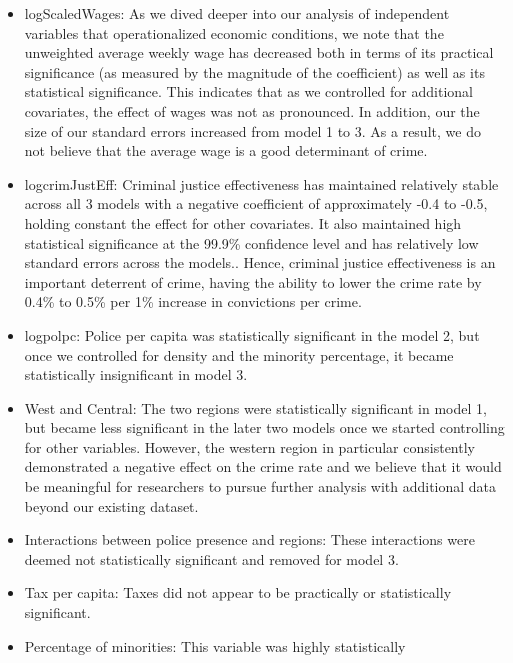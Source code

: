 \documentclass[]{article}
\providecommand{\tightlist}{%
  \setlength{\itemsep}{0pt}\setlength{\parskip}{0pt}}
\begin{document}
\begin{itemize}
\tightlist
\item
  logScaledWages: As we dived deeper into our analysis of independent
  variables that operationalized economic conditions, we note that the
  unweighted average weekly wage has decreased both in terms of its
  practical significance (as measured by the magnitude of the
  coefficient) as well as its statistical significance. This indicates
  that as we controlled for additional covariates, the effect of wages
  was not as pronounced. In addition, our the size of our standard
  errors increased from model 1 to 3. As a result, we do not believe
  that the average wage is a good determinant of crime.\\
\item
  logcrimJustEff: Criminal justice effectiveness has maintained
  relatively stable across all 3 models with a negative coefficient of
  approximately -0.4 to -0.5, holding constant the effect for other
  covariates. It also maintained high statistical significance at the
  99.9\% confidence level and has relatively low standard errors across
  the models.. Hence, criminal justice effectiveness is an important
  deterrent of crime, having the ability to lower the crime rate by
  0.4\% to 0.5\% per 1\% increase in convictions per crime.\\
\item
  logpolpc: Police per capita was statistically significant in the model
  2, but once we controlled for density and the minority percentage, it
  became statistically insignificant in model 3.\\
\item
  West and Central: The two regions were statistically significant in
  model 1, but became less significant in the later two models once we
  started controlling for other variables. However, the western region
  in particular consistently demonstrated a negative effect on the crime
  rate and we believe that it would be meaningful for researchers to
  pursue further analysis with additional data beyond our existing
  dataset.\\
\item
  Interactions between police presence and regions: These interactions
  were deemed not statistically significant and removed for model 3.
\item
  Tax per capita: Taxes did not appear to be practically or
  statistically significant.
\item
  Percentage of minorities: This variable was highly statistically

\end{itemize}
\end{document}
